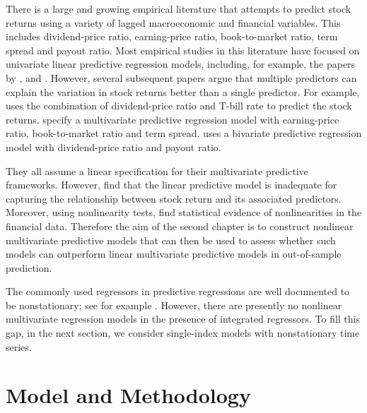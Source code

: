 \documentclass[12pt,a4paper]{article}
\begin{document}
There is a large and growing empirical literature that attempts to predict
stock returns using a variety of lagged macroeconomic and financial
variables. This includes dividend-price ratio, earning-price ratio,
book-to-market ratio, term spread and payout ratio. Most empirical studies in this
literature have focused on univariate linear predictive regression models,
including, for example, the papers by \cite{campbell1987stock}, \cite{fama1989business} and \cite{pesaran1995predictability}. However, several subsequent papers
argue that multiple predictors can explain the variation in stock returns
better than a single predictor. For example, \cite{ang2007stock} uses the
combination of dividend-price ratio and T-bill rate to predict the stock
returns. \cite{campbell2004caught} specify a multivariate predictive
regression model with earning-price ratio, book-to-market ratio and term
spread. \cite{lamont1998earnings} uses a bivariate predictive regression model with
dividend-price ratio and payout ratio.

They all assume a linear specification for their multivariate predictive
frameworks. However, \cite{qi1999nonlinear} find that the linear predictive model is
inadequate for capturing the relationship between stock return and its
associated predictors. Moreover, using nonlinearity tests, \cite{abhyankar1997uncovering} find statistical evidence of nonlinearities in the
financial data. Therefore the aim of the second chapter is to construct
nonlinear multivariate predictive models that can then be used to assess
whether such models can outperform linear multivariate predictive models in
out-of-sample prediction.

The commonly used regressors in predictive regressions are well documented
to be nonstationary; see for example \cite{kostakis2015robust}. However, there are presently no nonlinear multivariate regression models in the
presence of integrated regressors. To fill this gap, in the next section, we consider
single-index models with nonstationary time series.  


\section{Model and Methodology}
\end{document}
